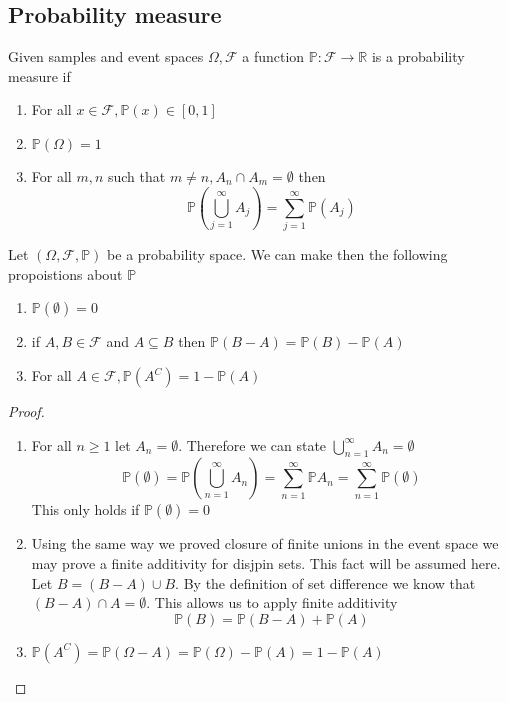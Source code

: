 \documentclass{article}
\begin{document}
\subsection{Probability measure}
\begin{definition}
    Given samples and event spaces $\Omega,\mathcal{F}$ a function $\mathbb{P} : \mathcal{F} \to \mathbb{R}$ is a probability measure if
    \begin{enumerate}
        \item For all $x \in \mathcal{F},\mathbb{P}(x) \in [0,1]$
        \item $\mathbb{P}(\Omega) = 1$
        \item For all $m,n$ such that $m \ne n,A_n \cap A_m = \emptyset$ then
        \[\mathbb{P}\left(\bigcup_{j=1}^\infty A_j\right) = \sum_{j=1}^\infty \mathbb{P}(A_j)\] 
    \end{enumerate}
\end{definition}
\begin{proposition}
    Let $(\Omega,\mathcal{F},\mathbb{P})$ be a probability space. We can make then the following propoistions about $\mathbb{P}$
    \begin{enumerate}
        \item $\mathbb{P}(\emptyset) = 0$
        \item if $A,B \in \mathcal{F}$ and $A \subseteq B$ then $\mathbb{P}(B - A) = \mathbb{P}(B) - \mathbb{P}(A)$
        \item For all $A \in \mathcal{F},\mathbb{P}(A^C) = 1 - \mathbb{P}(A)$
    \end{enumerate}
\end{proposition}
\begin{proof}
    \begin{enumerate}
        \item For all $n \ge 1$ let $A_n = \emptyset$. Therefore we can state $\bigcup_{n=1}^\infty A_n = \emptyset$
        \[\mathbb{P}(\emptyset) = \mathbb{P}\left(\bigcup_{n=1}^\infty A_n\right) = \sum_{n=1}^{\infty}\mathbb{P}A_n = \sum_{n=1}^{\infty}\mathbb{P}(\emptyset)\]
        This only holds if $\mathbb{P}(\emptyset) = 0$
        \item Using the same way we proved closure of finite unions in the event space we may prove a finite additivity for disjpin sets. This fact will be assumed here.
        Let $B = (B - A) \cup B$. By the definition of set difference we know that $(B - A) \cap A = \emptyset$. This allows us to apply finite additivity
        \[\mathbb{P}(B) = \mathbb{P}(B - A) + \mathbb{P}(A)\]
        \item $\mathbb{P}(A^C) = \mathbb{P}(\Omega - A) = \mathbb{P}(\Omega) - \mathbb{P}(A) = 1 - \mathbb{P}(A)$
    \end{enumerate}
\end{proof}
\end{document}
